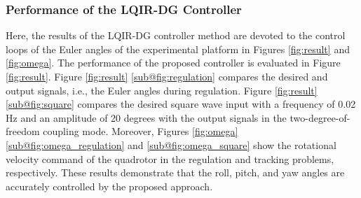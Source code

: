 \documentclass[preprint,12pt,authoryear]{elsarticle}
\begin{document}
\subsubsection{Performance of the LQIR-DG Controller}\label{sec:regulation}
\noindent Here, the results of the LQIR-DG controller method are devoted to the control loops of the Euler angles of the experimental platform in Figures \ref{fig:result} and \ref{fig:omega}.
The performance of the proposed controller is evaluated in Figure \ref{fig:result}. %
Figure \ref{fig:result} \ref{sub@fig:regulation} compares the desired and output signals, i.e., the Euler angles during regulation. Figure \ref{fig:result} \ref{sub@fig:square} compares the desired square wave input with a frequency of 0.02 Hz and an amplitude of 20 degrees with the output signals in the two-degree-of-freedom coupling mode.
Moreover, Figures \ref{fig:omega} \ref{sub@fig:omega_regulation} and \ref{sub@fig:omega_square} show the rotational velocity command of the quadrotor in the regulation and tracking problems, respectively. These results demonstrate that the roll, pitch, and yaw angles are accurately controlled by the proposed approach.
\end{document}
